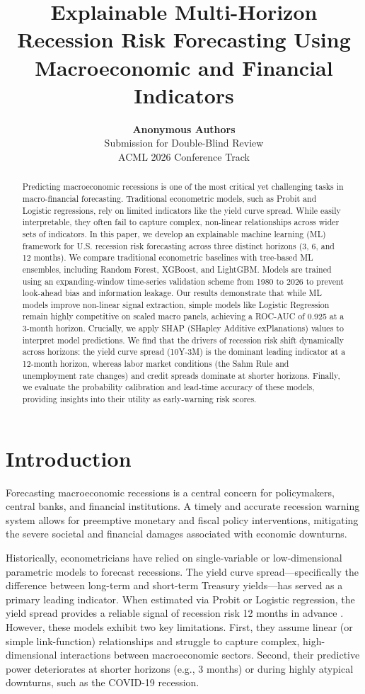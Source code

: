 \documentclass[11pt]{article}
\title{\textbf{Explainable Multi-Horizon Recession Risk Forecasting Using Macroeconomic and Financial Indicators}}
\author{\textbf{Anonymous Authors} \\
Submission for Double-Blind Review \\
ACML 2026 Conference Track}
\date{}
\begin{document}
\maketitle

\begin{abstract}
Predicting macroeconomic recessions is one of the most critical yet challenging tasks in macro-financial forecasting. Traditional econometric models, such as Probit and Logistic regressions, rely on limited indicators like the yield curve spread. While easily interpretable, they often fail to capture complex, non-linear relationships across wider sets of indicators. In this paper, we develop an explainable machine learning (ML) framework for U.S. recession risk forecasting across three distinct horizons (3, 6, and 12 months). We compare traditional econometric baselines with tree-based ML ensembles, including Random Forest, XGBoost, and LightGBM. Models are trained using an expanding-window time-series validation scheme from 1980 to 2026 to prevent look-ahead bias and information leakage. Our results demonstrate that while ML models improve non-linear signal extraction, simple models like Logistic Regression remain highly competitive on scaled macro panels, achieving a ROC-AUC of 0.925 at a 3-month horizon. Crucially, we apply SHAP (SHapley Additive exPlanations) values to interpret model predictions. We find that the drivers of recession risk shift dynamically across horizons: the yield curve spread (10Y-3M) is the dominant leading indicator at a 12-month horizon, whereas labor market conditions (the Sahm Rule and unemployment rate changes) and credit spreads dominate at shorter horizons. Finally, we evaluate the probability calibration and lead-time accuracy of these models, providing insights into their utility as early-warning risk scores.
\end{abstract}

\section{Introduction}
Forecasting macroeconomic recessions is a central concern for policymakers, central banks, and financial institutions. A timely and accurate recession warning system allows for preemptive monetary and fiscal policy interventions, mitigating the severe societal and financial damages associated with economic downturns. 

Historically, econometricians have relied on single-variable or low-dimensional parametric models to forecast recessions. The yield curve spread—specifically the difference between long-term and short-term Treasury yields—has served as a primary leading indicator. When estimated via Probit or Logistic regression, the yield spread provides a reliable signal of recession risk 12 months in advance \citep{estella1998yield, wright2006yield}. However, these models exhibit two key limitations. First, they assume linear (or simple link-function) relationships and struggle to capture complex, high-dimensional interactions between macroeconomic sectors. Second, their predictive power deteriorates at shorter horizons (e.g., 3 months) or during highly atypical downturns, such as the COVID-19 recession.
\end{document}
